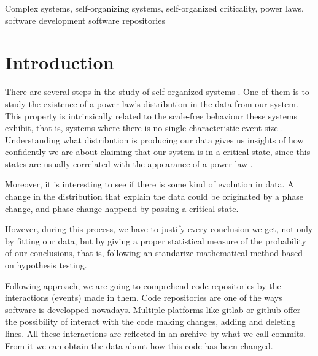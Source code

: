 \documentclass[conference]{IEEEtran}
\begin{document}
\begin{IEEEkeywords}
	Complex systems, self-organizing systems, self-organized criticality, power laws, software development
	software repositories
\end{IEEEkeywords}


\section{Introduction}\label{introduction}

There are several steps in the study of self-organized systems  \cite{bak1988self}. One of
them is to study the existence of a power-law's distribution in the data
from our system. This property is intrinsically related to the scale-free behaviour
these systems exhibit, that is, systems where there is no single characteristic event size \cite{golyk20self}.
Understanding what distribution is producing our data gives us insights of
how confidently we are about claiming that our system is in a critical state, since this states
are usually correlated with the appearance of a power law \cite{newman2005power}. %

Moreover, it is interesting to see if there is some kind of evolution in data. 
A change in the distribution that explain the data could be originated by a 
phase change, and phase change happend by passing a critical state. 

However, during this process, we have to justify every conclusion we get, not only 
by fitting our data, but by giving a proper statistical measure of the probability 
of our conclusions, that is, following an standarize mathematical method based on
hypothesis testing.%


Following \cite{merelo2017self} approach, we are going to comprehend code repositories
by the interactions (events) made in them. Code repositories are one of the ways 
software is developped nowadays. Multiple platforms like gitlab or github 
offer the possibility of interact with the code making changes, adding and deleting 
lines. 
All these interactions are reflected in an archive by what we call commits. From it
we can obtain the data about how this code has been changed. 
\end{document}
